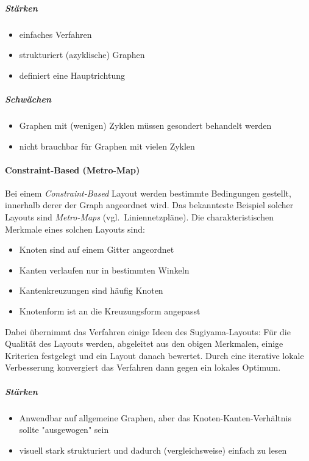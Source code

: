 					\subparagraph{Stärken}
					\begin{itemize}
						\item einfaches Verfahren
						\item strukturiert (azyklische) Graphen
						\item definiert eine Hauptrichtung
					\end{itemize}

					\subparagraph{Schwächen}
					\begin{itemize}
						\item Graphen mit (wenigen) Zyklen müssen gesondert behandelt werden
						\item nicht brauchbar für Graphen mit vielen Zyklen
					\end{itemize}

				\paragraph{Constraint-Based (Metro-Map)}
					Bei einem \emph{Constraint-Based} Layout werden bestimmte Bedingungen gestellt, innerhalb derer der Graph angeordnet wird. Das bekannteste Beispiel solcher Layouts sind \emph{Metro-Maps} (vgl.~Liniennetzpläne). Die charakteristischen Merkmale eines solchen Layouts sind:
					\begin{itemize}
						\item Knoten sind auf einem Gitter angeordnet
						\item Kanten verlaufen nur in bestimmten Winkeln
						\item Kantenkreuzungen sind häufig Knoten
						\item Knotenform ist an die Kreuzungsform angepasst
					\end{itemize}
					Dabei übernimmt das Verfahren einige Ideen des Sugiyama-Layouts: Für die Qualität des Layouts werden, abgeleitet aus den obigen Merkmalen, einige Kriterien festgelegt und ein Layout danach bewertet. Durch eine iterative lokale Verbesserung konvergiert das Verfahren dann gegen ein lokales Optimum.

					\subparagraph{Stärken}
					\begin{itemize}
						\item Anwendbar auf allgemeine Graphen, aber das Knoten-Kanten-Verhältnis sollte "ausgewogen" sein
						\item visuell stark strukturiert und dadurch (vergleichsweise) einfach zu lesen
					\end{itemize}

